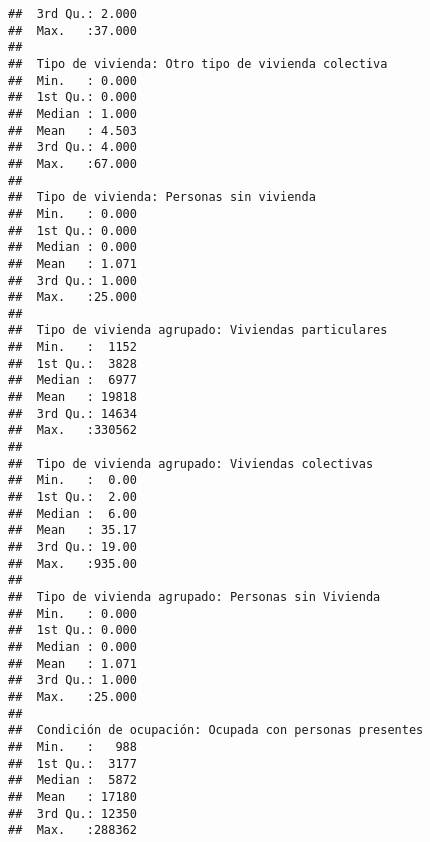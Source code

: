 \documentclass[11pt,]{article}
\begin{document}
\begin{verbatim}
##  3rd Qu.: 2.000                                     
##  Max.   :37.000                                     
##                                                     
##  Tipo de vivienda: Otro tipo de vivienda colectiva
##  Min.   : 0.000                                   
##  1st Qu.: 0.000                                   
##  Median : 1.000                                   
##  Mean   : 4.503                                   
##  3rd Qu.: 4.000                                   
##  Max.   :67.000                                   
##                                                   
##  Tipo de vivienda: Personas sin vivienda
##  Min.   : 0.000                         
##  1st Qu.: 0.000                         
##  Median : 0.000                         
##  Mean   : 1.071                         
##  3rd Qu.: 1.000                         
##  Max.   :25.000                         
##                                         
##  Tipo de vivienda agrupado: Viviendas particulares
##  Min.   :  1152                                   
##  1st Qu.:  3828                                   
##  Median :  6977                                   
##  Mean   : 19818                                   
##  3rd Qu.: 14634                                   
##  Max.   :330562                                   
##                                                   
##  Tipo de vivienda agrupado: Viviendas colectivas
##  Min.   :  0.00                                 
##  1st Qu.:  2.00                                 
##  Median :  6.00                                 
##  Mean   : 35.17                                 
##  3rd Qu.: 19.00                                 
##  Max.   :935.00                                 
##                                                 
##  Tipo de vivienda agrupado: Personas sin Vivienda
##  Min.   : 0.000                                  
##  1st Qu.: 0.000                                  
##  Median : 0.000                                  
##  Mean   : 1.071                                  
##  3rd Qu.: 1.000                                  
##  Max.   :25.000                                  
##                                                  
##  Condición de ocupación: Ocupada con personas presentes
##  Min.   :   988                                        
##  1st Qu.:  3177                                        
##  Median :  5872                                        
##  Mean   : 17180                                        
##  3rd Qu.: 12350                                        
##  Max.   :288362                                        

\end{verbatim}
\end{document}
